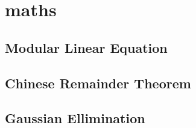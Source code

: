 \section{maths}
\subsection{Modular Linear Equation}
\subsection{Chinese Remainder Theorem}
\subsection{Gaussian Ellimination}